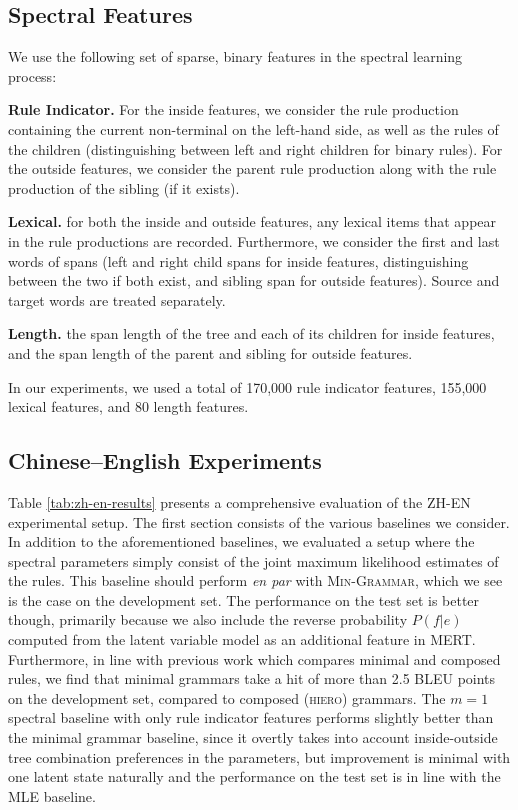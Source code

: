 \documentclass[11pt]{article}
\newenvironment{itemizesquish}{\begin{list}{\setcounter{enumi}{0}\labelitemi}{\setlength{\itemsep}{-0.25em}\setlength{\labelwidth}{0.5em}\setlength{\leftmargin}{\labelwidth}\addtolength{\leftmargin}{\labelsep}}}{\end{list}}
\begin{document}
\subsection{Spectral Features}
\label{sec:features}
We use the following set of sparse, binary features in the spectral learning process:
\begin{itemizesquish}
	\item \textbf{Rule Indicator.} For the inside features, we consider the rule production containing the current non-terminal on the left-hand side, as well as the rules of the children (distinguishing between left and right children for binary rules).  
	For the outside features, we consider the parent rule production along with the rule production of the sibling (if it exists). 
	\item \textbf{Lexical.} for both the inside and outside features, any lexical items that appear in the rule productions are recorded.  
	Furthermore, we consider the first and last words of spans (left and right child spans for inside features, distinguishing between the two if both exist, and sibling span for outside features).  
	Source and target words are treated separately. 
	\item \textbf{Length.} the span length of the tree and each of its children for inside features, and the span length of the parent and sibling for outside features. 	
\end{itemizesquish}
In our experiments, we used a total of 170,000 rule indicator features, 155,000 lexical features, and 80 length features.  

\subsection{Chinese--English Experiments}
Table \ref{tab:zh-en-results} presents a comprehensive evaluation of the \textsc{ZH-EN} experimental setup.  
The first section consists of the various baselines we consider. 
In addition to the aforementioned baselines, we evaluated a setup where the spectral parameters simply consist of the joint maximum likelihood estimates of the rules.  
This baseline should perform \emph{en par} with \textsc{Min-Grammar}, which we see is the case on the development set.  
The performance on the test set is better though, primarily because we also include the reverse probability $P(f|e)$ computed from the latent variable model as an additional feature in MERT.  
Furthermore, in line with previous work \cite{Galley2006} which compares minimal and composed rules, we find that minimal grammars take a hit of more than 2.5 BLEU points on the development set, compared to composed (\textsc{hiero}) grammars.  
The $m=1$ spectral baseline with only rule indicator features performs slightly better than the minimal grammar baseline, since it overtly takes into account inside-outside tree combination preferences in the parameters, but improvement is minimal with one latent state naturally and the performance on the test set is in line with the MLE baseline.  
\end{document}
